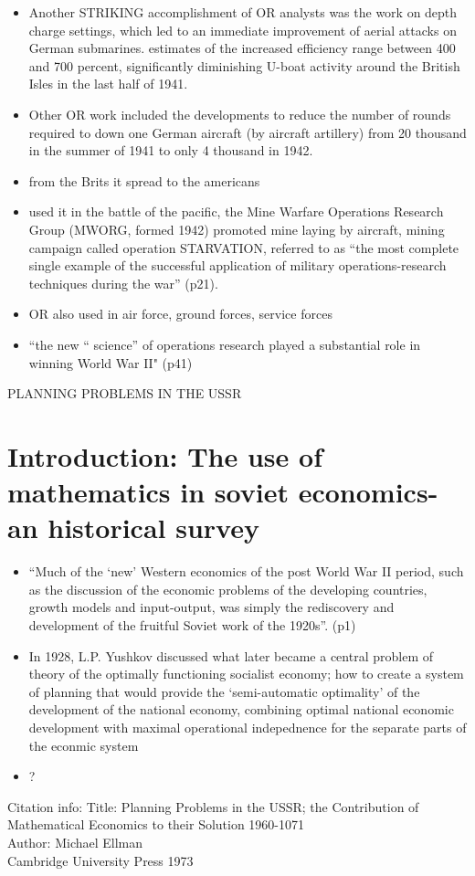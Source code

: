 \documentclass{article}
\begin{document}
\begin{itemize}
\item Another STRIKING accomplishment of OR analysts was the work on depth charge settings, which led to an immediate improvement of aerial attacks on German submarines. estimates of the increased efficiency range between 400 and 700 percent, significantly diminishing U-boat activity around the British Isles in the last half of 1941.
\item Other OR work included the developments to reduce the number of rounds required to down one German aircraft (by aircraft artillery) from 20 thousand in the summer of 1941 to only 4 thousand in 1942.
\item from the Brits it spread to the americans 
\item used it in the battle of the pacific, the Mine Warfare Operations Research Group (MWORG, formed 1942) promoted mine laying by aircraft, mining campaign called operation STARVATION, referred to as ``the most complete single example of the successful application of military operations-research techniques during the war'' (p21).
\item OR also used in air force, ground forces, service forces
\item ``the new `` science'' of operations research played a substantial role in winning World War II" (p41)

\end{itemize}

%
%
%
%
%
%
%
\newpage
{\LARGE PLANNING PROBLEMS IN THE USSR}
\setcounter{section}{0}
\section{Introduction: The use of mathematics in soviet economics- an historical survey}
\begin{itemize}
\item ``Much of the `new' Western economics of the post World War II period, such as the discussion of the economic problems of the developing countries, growth models and input-output, was simply the rediscovery and development of the fruitful Soviet work of the 1920s''. (p1)
\item In 1928, L.P. Yushkov discussed what later became a central problem of theory of the optimally functioning socialist economy; how to create a system of planning that would provide the `semi-automatic optimality' of the development of the national economy, combining optimal national economic development with maximal operational indepednence for the separate parts of the econmic system
\item ?
\end{itemize}
Citation info:
Title: Planning Problems in the USSR; the Contribution of Mathematical Economics to their Solution 1960-1071\\
Author: Michael Ellman\\
Cambridge University Press 1973
\end{document}
